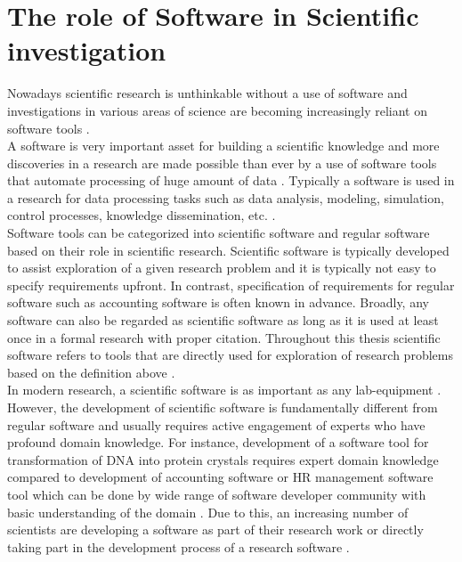 \chapter{The role of Software in Scientific investigation}
\label{ch:Roles}

%

Nowadays scientific research is unthinkable without a use of software and investigations in various areas of science are becoming increasingly reliant on software tools \citep{goble2014better, storer2017bridging, hannay2009scientists, jimenez2017four}. \\

A software is very important asset for building a scientific knowledge and more discoveries in a research are made possible than ever by a use of software tools that automate processing of huge amount of data \citep{jimenez2017four}. Typically a software is used in a research for data processing tasks such as data analysis, modeling, simulation, control processes, knowledge dissemination, etc. \citep{hannay2009scientists, pan2016disciplinary}. \\


Software tools can be categorized into scientific software and regular software based on their role in scientific research. Scientific software is typically developed to assist exploration of a given research problem and it is typically not easy to specify requirements upfront. In contrast, specification of requirements for regular software such as accounting software is often known in advance. Broadly, any software can also be regarded as scientific software as long as it is used at least once in a formal research with proper citation. Throughout this thesis scientific software refers to tools that are directly used for exploration of research problems based on the definition above \citep{hannay2009scientists,goble2014better}. \\


In modern research, a scientific software is as important as any lab-equipment \citep{wilson2014best}. However, the development of scientific software is fundamentally different from regular software and usually requires active engagement of experts who have profound domain knowledge. For instance, development of a software tool for transformation of \ac{DNA} into protein crystals requires expert domain knowledge compared to development of accounting software or \ac{HR} management software tool which can be done by wide range of software developer community with basic understanding of the domain \citep{wilson2014best, segal2008developing}. Due to this, an increasing number of scientists are developing a software as part of their research work or directly taking part in the development process of a research software \citep{jimenez2017four, kanewala2014testing}. \\


